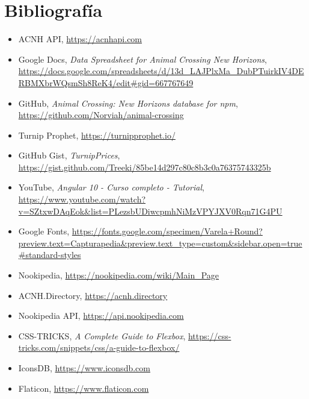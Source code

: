 \chapter{Bibliografía}\label{bibliografia}

\begin{itemize}
	\item ACNH API, \href{https://acnhapi.com}{https://acnhapi.com}
	
	\item Google Docs, \textit{Data Spreadsheet for Animal Crossing New Horizons}, \url{https://docs.google.com/spreadsheets/d/13d_LAJPlxMa_DubPTuirkIV4DERBMXbrWQsmSh8ReK4/edit#gid=667767649}
	
	\item GitHub, \textit{Animal Crossing: New Horizons database for npm}, \url{https://github.com/Norviah/animal-crossing}
	
	\item Turnip Prophet, \url{https://turnipprophet.io/}
	
	\item GitHub Gist, \textit{TurnipPrices}, \url{https://gist.github.com/Treeki/85be14d297c80c8b3c0a76375743325b}
	
	\item YouTube, \textit{Angular 10 - Curso completo - Tutorial}, \url{https://www.youtube.com/watch?v=SZtxwDAqEok&list=PLezsbUDiwcpmhNiMzVPYJXV0Rqn71G4PU}
	
	\item Google Fonts, \url{https://fonts.google.com/specimen/Varela+Round?preview.text=Capturapedia&preview.text_type=custom&sidebar.open=true#standard-styles}
	
	\item Nookipedia, \url{https://nookipedia.com/wiki/Main_Page}
	
	\item ACNH.Directory, \url{https://acnh.directory}
	
	\item Nookipedia API, \url{https://api.nookipedia.com}
	
	\item CSS-TRICKS, \textit{A Complete Guide to Flexbox}, \url{https://css-tricks.com/snippets/css/a-guide-to-flexbox/}
	
	\item IconsDB, \url{https://www.iconsdb.com}
	
	\item Flaticon, \url{https://www.flaticon.com}
	

\end{itemize}
